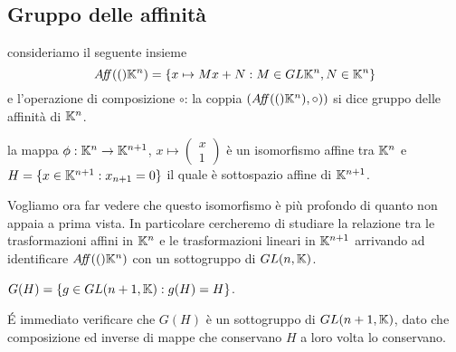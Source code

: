 \documentclass[a4paper,12pt]{article}
\newcommand{\Got}[1]{#1}
\newcommand{\got}[1]{{#1}}
\begin{document}
	\subsection{Gruppo delle affinità}
 
 \begin{definition}
 \Got{consideriamo il seguente insieme}
 \[
	\got{\Aff(\K^n)=\{x\mapsto Mx+N : M\in GL{\K^n}, N\in \K^n\}}
 \]
 \Got{e l'operazione di composizione} $\circ$: \Got{la coppia} $\got{(\Aff(\K^n),\circ))}$ \Got{si dice gruppo delle affinità di} $\got{\K^n}$.
 \end{definition}
 
 \begin{remark}
 \Got{la mappa} $\phi:\mathbb K^n\rightarrow \mathbb K^{n+1}$, $x\mapsto\left( \begin{matrix}
                                                              x\\
                                                              \hline
                                                              1
                                                             \end{matrix} \right)
$ \Got{è un isomorfismo affine tra} $\got{\K^n}$ \Got{e}\\
$\got{H=\{x\in \K^{n+1} : x_{n+1}=0\}}$ \Got{il quale è sottospazio affine di } $\got{\K^{n+1}}$.
 \end{remark}
 
 \Got{Vogliamo ora far vedere che questo isomorfismo è più profondo di quanto non appaia a prima vista. In particolare cercheremo di studiare}
 \Got{la relazione tra le trasformazioni affini in} $\mathbb K^n$ \Got{e le trasformazioni lineari in} $\mathbb K^{n+1}$ \Got{arrivando ad identificare}
 $\got{\Aff(\K^n)}$ \Got{con un sottogruppo di} $\got{GL(n,\K)}$.
 
 \begin{definition}
 \Got{} $\got{G(H)=\{g\in GL(n+1,\K):g(H)=H\}}$.
 \end{definition}
 
 \begin{remark}
 \Got{\'E immediato verificare che } $\got{G(H)}$ \Got{è un sottogruppo di } $\got{GL(n+1,\K)}$,
 \Got{dato che composizione ed inverse di mappe che conservano} $\got{H}$ \Got{a loro volta lo conservano}.
 \end{remark}
 
\end{document}
